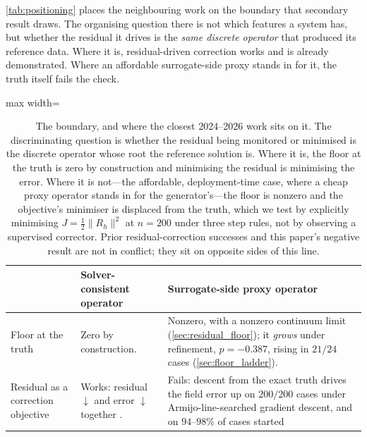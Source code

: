 
\autoref{tab:positioning} places the neighbouring work on the boundary that secondary
result draws. The organising question there is not which features a system has, but
whether the residual it drives is the \emph{same discrete operator} that produced its
reference data. Where it is, residual-driven correction works and is already
demonstrated. Where an affordable surrogate-side proxy stands in for it, the truth itself
fails the check.

\begin{table}[t]
\centering
\small
\caption{The boundary, and where the closest 2024--2026 work sits on it. The
discriminating question is whether the residual being monitored or minimised is the
discrete operator whose root the reference solution is. Where it is, the floor at the
truth is zero by construction and minimising the residual is minimising the error. Where
it is not---the affordable, deployment-time case, where a cheap proxy operator stands in
for the generator's---the floor is nonzero and the objective's minimiser is displaced from
the truth, which we test by explicitly minimising $J=\tfrac12\|R_h\|^2$ at $n=200$ under
three step rules, not by observing a supervised corrector. Prior residual-correction
successes and this paper's negative result are not in
conflict; they sit on opposite sides of this line.}
\label{tab:positioning}
\begin{adjustbox}{max width=\textwidth}
\begin{tabular}{p{} p{} p{}}
\toprule
 & \textbf{Solver-consistent operator} & \textbf{Surrogate-side proxy operator} \\
\midrule
Floor at the truth
 & Zero by construction.
 & Nonzero, with a nonzero continuum limit (\autoref{sec:residual_floor}); it
   \emph{grows} under refinement, $p=-0.387$, rising in $21/24$ cases
   (\autoref{sec:floor_ladder}). \\
\addlinespace
Residual as a correction objective
 & Works: residual $\downarrow$ and error $\downarrow$ together \citep{lei2026newtonkrylov, huang2025physicscorrect, learned2023residualcorrection}.
 & Fails: descent from the exact truth drives the field error up on $200/200$ cases
   under Armijo-line-searched gradient descent, and on $94$--$98\%$ of cases started

\end{tabular}
\end{adjustbox}
\end{table}

